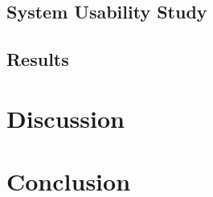 \documentclass[twoside, parskip]{VRThesis} %
\begin{document}
\section{\label{sec::Methology}System Usability Study}

\section{\label{sec::Results}Results}


\chapter{\label{chap::Discussion}Discussion}


\chapter{\label{chap::Conclusion}Conclusion}



%

\end{document}
